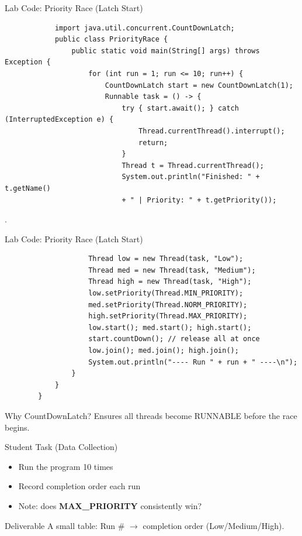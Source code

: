 \documentclass[aspectratio=169,11pt]{beamer}
\begin{document}
\begin{frame}[fragile]{Lab Code: Priority Race (Latch Start)}
		\begin{verbatim}
			import java.util.concurrent.CountDownLatch;
			public class PriorityRace {
				public static void main(String[] args) throws Exception {
					for (int run = 1; run <= 10; run++) {
						CountDownLatch start = new CountDownLatch(1);
						Runnable task = () -> {
							try { start.await(); } catch (InterruptedException e) {
								Thread.currentThread().interrupt();
								return;
							}
							Thread t = Thread.currentThread();
							System.out.println("Finished: " + t.getName()
							+ " | Priority: " + t.getPriority());
		\end{verbatim}
.
	\end{frame}
	\begin{frame}[fragile]{Lab Code: Priority Race (Latch Start)}
	\begin{verbatim}
					Thread low = new Thread(task, "Low");
					Thread med = new Thread(task, "Medium");
					Thread high = new Thread(task, "High");
					low.setPriority(Thread.MIN_PRIORITY);
					med.setPriority(Thread.NORM_PRIORITY);
					high.setPriority(Thread.MAX_PRIORITY);
					low.start(); med.start(); high.start();
					start.countDown(); // release all at once
					low.join(); med.join(); high.join();
					System.out.println("---- Run " + run + " ----\n");
				}
			}
		}
	\end{verbatim}
	\footnotesize Why CountDownLatch? Ensures all threads become RUNNABLE before the race begins.
\end{frame}
	\begin{frame}{Student Task (Data Collection)}
		\begin{itemize}
			\item Run the program 10 times
			\item Record completion order each run
			\item Note: does \textbf{MAX\_PRIORITY} consistently win?
		\end{itemize}
		
		\vspace{3mm}
		\begin{block}{Deliverable}
			A small table: Run \# $\rightarrow$ completion order (Low/Medium/High).
		\end{block}
	\end{frame}
	
\end{document}

